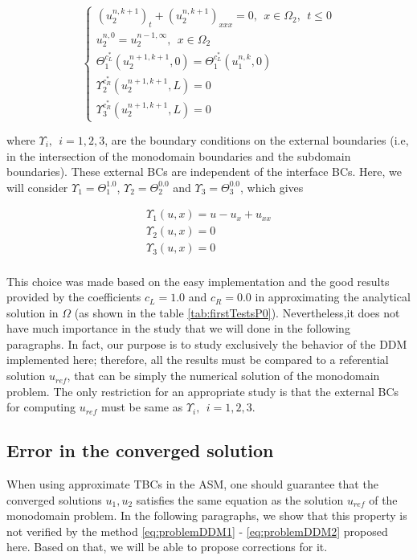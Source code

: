 \begin{equation}
    \label{eq:problemDDM2}
    \begin{cases}
        (u_2^{n,k+1})_t + (u_2^{n,k+1})_{xxx} = 0 , \ \ x \in \Omega_2, \ \ t \leq 0\\
        u_2^{n,0} = u_2^{n-1,\infty} , \ \ x \in \Omega_2 \\
        \Theta_1^{c_L^*}(u_2^{n+1,k+1},0) = \Theta_1^{c_L^*}(u_1^{n,k},0) \\
        \Upsilon_2^{c_R^*}(u_2^{n+1,k+1},L) = 0 \\
        \Upsilon_3^{c_R^*}(u_2^{n+1,k+1},L) = 0
     \end{cases}
\end{equation}

\indent where $ \Upsilon_i, \ \ i=1,2,3$, are the boundary conditions on the external boundaries (i.e, in the intersection of the monodomain boundaries and the subdomain boundaries). These external BCs are independent of the interface BCs. Here, we will consider $\Upsilon_1 = \Theta_1^{1.0}$, $\Upsilon_2 = \Theta_2^{0.0}$ and $\Upsilon_3 = \Theta_3^{0.0}$, which gives

\begin{gather}
	\Upsilon_1(u,x) = u - u_x + u_{xx} \\
	\Upsilon_2(u,x) = 0 \\
	\Upsilon_3(u,x) = 0 \\
\end{gather}

\indent This choice was made based on the easy implementation and the good results provided by the coefficients $c_L = 1.0$ and $c_R = 0.0$ in approximating the analytical solution in $\Omega$ (as shown in the table \ref{tab:firstTestsP0}). Nevertheless,it does not have much importance in the study that we will done in the following paragraphs. In fact, our purpose is to study exclusively the behavior of the DDM implemented here; therefore, all the results must be compared to a referential solution $u_{ref}$, that can be simply the numerical solution of the monodomain problem. The only restriction for an appropriate study is that the external BCs for computing $u_{ref}$ must be same as $\Upsilon_i, \ \ i=1,2,3$.

\subsection{Error in the converged solution}

\indent When using approximate TBCs in the ASM, one should guarantee that the converged solutions $u_1,u_2$ satisfies the same equation as the solution $u_{ref}$ of the monodomain problem. In the following paragraphs, we show that this property is not verified by the method \eqref{eq:problemDDM1} - \eqref{eq:problemDDM2} proposed here. Based on that, we will be able to propose corrections for it.



